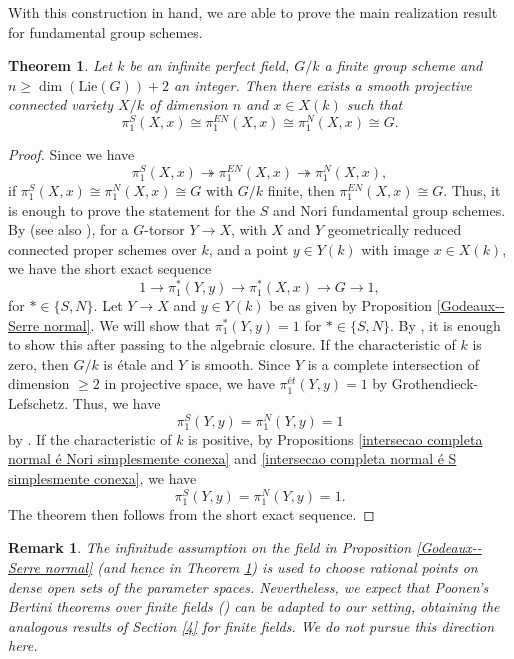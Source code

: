 \documentclass[a4paper,12pt]{amsart}
\newtheorem{theorem}[definition]{Theorem}
\newtheorem{remark}[definition]{Remark}
\numberwithin{equation}{section}
\renewcommand{\geq}{\geqslant}
\renewcommand{\_}{\rule{0.25cm}{0.4pt}}
\begin{document}
With this construction in hand, we are able to prove the main realization result for fundamental group schemes.

\begin{theorem}\label{fundamental group}
    Let $k$ be an infinite perfect field, $G/k$ a finite group scheme and $n\geq \dim(\text{Lie}(G))+2$ an integer. Then there exists a smooth projective connected variety $X/k$ of dimension $n$ and $x\in X(k)$ such that
    \[
    \pi_{1}^{S}(X,x)\cong\pi_{1}^{EN}(X,x)\cong\pi_{1}^{N}(X,x)\cong G.
    \]
\end{theorem}
\begin{proof}
    Since we have
    \[
    \pi^{S}_{1}(X,x)\twoheadrightarrow \pi^{EN}_{1}(X,x)\twoheadrightarrow \pi^{N}_{1}(X,x),
    \]
    if $\pi^{S}_{1}(X,x)\cong \pi^{N}_{1}(X,x)\cong G$ with $G/k$ finite, then $\pi^{EN}_{1}(X,x)\cong G$. Thus, it is enough to prove the statement for the $S$ and Nori fundamental group schemes. By \cite[Corollary I and Theorem IV]{Antei2019-og} (see also \cite[Theorem 4.7.]{li2026varietiesprescribedfundamentalgroup}), for a $G$-torsor $Y\to X$, with $X$ and $Y$ geometrically reduced connected proper schemes over $k$, and a point $y\in Y(k)$ with image $x\in X(k)$, we have the short exact sequence 
    \[
    1\to \pi_{1}^{\ast}(Y,y)\to \pi_{1}^{\ast}(X,x)\to G\to 1,
    \]
    for $\ast\in\{S, N\}$. Let $Y\to X$ and $y\in Y(k)$ be as given by Proposition \ref{Godeaux--Serre normal}. We will show that $\pi_{1}^{\ast}(Y,y)=1$ for $\ast\in\{S, N\}$. By \cite[Propositions 5.8.(4) and 5.14.(5)]{li2026basechangefundamentalgroup}, it is enough to show this after passing to the algebraic closure. If the characteristic of $k$ is zero, then $G/k$ is étale and $Y$ is smooth. Since $Y$ is a complete intersection of dimension $\geq 2$ in projective space, we have $\pi^{ét}_{1}(Y,y)=1$ by Grothendieck-Lefschetz. Thus, we have
    \[
    \pi_{1}^{S}(Y,y)=\pi_{1}^{N}(Y,y)=1
    \]
    by \cite[Section 2]{EsnaultMehta2011}. If the characteristic of $k$ is positive, by Propositions \ref{intersecao completa normal é Nori simplesmente conexa} and \ref{intersecao completa normal é S simplesmente conexa}, we have
    \[
    \pi_{1}^{S}(Y,y)=\pi_{1}^{N}(Y,y)=1.
    \]
    The theorem then follows from the short exact sequence.
\end{proof}

\begin{remark}
    The infinitude assumption on the field in Proposition \ref{Godeaux--Serre normal} (and hence in Theorem \ref{fundamental group}) is used to choose rational points on dense open sets of the parameter spaces. Nevertheless, we expect that Poonen's Bertini theorems over finite fields (\cite{Poonen2004-ei}) can be adapted to our setting, obtaining the analogous results of Section \ref{4} for finite fields. We do not pursue this direction here.
\end{remark}



\printbibliography
\end{document}

